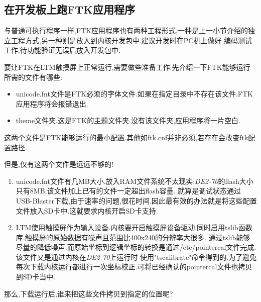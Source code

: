 \documentclass[12pt,a4paper,titlepage]{article}
\begin{document}
\subsection{在开发板上跑FTK应用程序}
与普通可执行程序一样,FTK应用程序也有两种工程形式,一种是上一小节介绍的独立工程方式,另一种则是放入到内核开发包中.建议开发时在PC机上做好
编码测试工作.待功能验证无误后放入开发包中.

要让FTK在LTM触摸屏上正常运行,需要做些准备工作.先介绍一下FTK能够运行所需的文件有哪些:
\begin{itemize}
\item unicode.fnt文件是FTK必须的字体文件.如果在指定目录中不存在该文件.FTK应用程序将会报错退出.
\item theme文件夹.这是FTK的主题文件夹.没有该文件夹,应用程序将一片空白.
\end{itemize}
这两个文件是FTK能够运行的最小配置.其他如ftk.cnf并非必须,若存在会改变ftk配置路径.

但是,仅有这两个文件是远远不够的!

\begin{enumerate}
\item unicode.fnt文件有几MB大小.放入RAM文件系统不太现实:\textit{DE2-70}的flash大小只有8MB,该文件加上已有的文件一定超出flash容量.
就算是调试状态通过USB-Blaster下载,由于速率的问题,很花时间.因此最有效的办法就是将这些配置文件放入SD卡中.这就要求内核开启SD卡支持.
\item LTM使用触摸屏作为输入设备.内核要开启触摸屏设备驱动.同时启用tslib函数库.触摸屏的原始数据有噪声且范围比400x240的分辨率大很多.
通过tslib能够尽量的降低噪声.而原始坐标到逻辑坐标的转换是通过/etc/pointercal文件完成.该文件又是通过内核在\textit{DE2-70}上运行时
使用"tscalibrate"命令得到的.为了避免每次下载内核运行都进行一次坐标校正.可将已经确认的pointercal文件也拷贝到SD卡当中.
\end{enumerate}

那么,下载运行后,谁来把这些文件拷贝到指定的位置呢?
\end{document}
